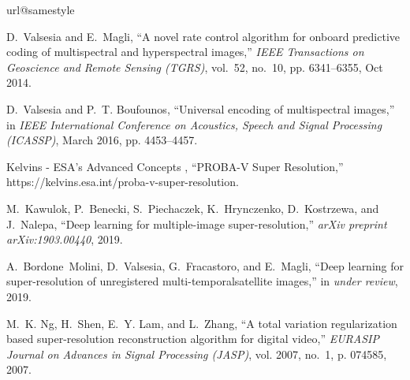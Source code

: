 \documentclass[journal]{IEEEtran}
\begin{document}
\ifCLASSOPTIONcaptionsoff
  \newpage
\fi




\begin{thebibliography}{10}
\providecommand{\url}[1]{#1}
\csname url@samestyle\endcsname
\providecommand{\newblock}{\relax}
\providecommand{\bibinfo}[2]{#2}
\providecommand{\BIBentrySTDinterwordspacing}{\spaceskip=0pt\relax}
\providecommand{\BIBentryALTinterwordstretchfactor}{4}
\providecommand{\BIBentryALTinterwordspacing}{\spaceskip=\fontdimen2\font plus
\BIBentryALTinterwordstretchfactor\fontdimen3\font minus
  \fontdimen4\font\relax}
\providecommand{\BIBforeignlanguage}[2]{{\expandafter\ifx\csname l@#1\endcsname\relax
\typeout{** WARNING: IEEEtran.bst: No hyphenation pattern has been}\typeout{** loaded for the language `#1'. Using the pattern for}\typeout{** the default language instead.}\else
\language=\csname l@#1\endcsname
\fi
#2}}
\providecommand{\BIBdecl}{\relax}
\BIBdecl

D.~{Valsesia} and E.~{Magli}, ``A novel rate control algorithm for onboard
  predictive coding of multispectral and hyperspectral images,'' \emph{IEEE
  Transactions on Geoscience and Remote Sensing (TGRS)}, vol.~52, no.~10, pp.
  6341--6355, Oct 2014.

D.~{Valsesia} and P.~T. {Boufounos}, ``Universal encoding of multispectral
  images,'' in \emph{IEEE International Conference on Acoustics, Speech and
  Signal Processing (ICASSP)}, March 2016, pp. 4453--4457.

{Kelvins - ESA's Advanced Concepts }, ``{PROBA-V Super Resolution},''
  \url{https://kelvins.esa.int/proba-v-super-resolution}.

M.~Kawulok, P.~Benecki, S.~Piechaczek, K.~Hrynczenko, D.~Kostrzewa, and
  J.~Nalepa, ``Deep learning for multiple-image super-resolution,'' \emph{arXiv
  preprint arXiv:1903.00440}, 2019.

A.~Bordone~Molini, D.~Valsesia, G.~Fracastoro, and E.~Magli, ``Deep learning
  for super-resolution of unregistered multi-temporalsatellite images,'' in
  \emph{under review}, 2019.

M.~K. Ng, H.~Shen, E.~Y. Lam, and L.~Zhang, ``A total variation regularization
  based super-resolution reconstruction algorithm for digital video,''
  \emph{EURASIP Journal on Advances in Signal Processing (JASP)}, vol. 2007,
  no.~1, p. 074585, 2007.


\end{thebibliography}
\end{document}

